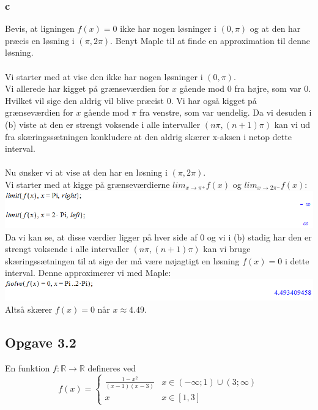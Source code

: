 \documentclass[12pt]{article}
\begin{document}
\subsubsection*{c}
Bevis, at ligningen $f(x)=0$ ikke har nogen løsninger i $(0,\pi)$ og at den har præcis en løsning i $(\pi,2\pi)$. Benyt Maple til at finde en approximation til denne løsning.\\
\\
Vi starter med at vise den ikke har nogen løsninger i $(0,\pi)$.\\
Vi allerede har kigget på grænseværdien for $x$ gående mod 0 fra højre, som var 0. Hvilket vil sige den aldrig vil blive præcist 0. Vi har også kigget på grænseværdien for $x$ gående mod $\pi$ fra venstre, som var uendelig. Da vi desuden i (b) viste at den er strengt voksende i alle intervaller $(n\pi,(n+1)\pi)$ kan vi ud fra skæringssætningen konkludere at den aldrig skærer x-aksen i netop dette interval.\\
\\
Nu ønsker vi at vise at den har en løsning i $(\pi,2\pi)$.\\
Vi starter med at kigge på grænseværdierne $lim_{x\rightarrow\pi^{+}}f(x)$ og $lim_{x\rightarrow2\pi^{-}}f(x)$:\\
\includegraphics[scale=0.6]{Pic2}\\
Da vi kan se, at disse værdier ligger på hver side af $0$ og vi i (b) stadig har den er strengt voksende i alle intervaller $(n\pi,(n+1)\pi)$ kan vi bruge skæringssætningen til at sige der må være nøjagtigt en løsning $f(x)=0$ i dette interval. Denne approximerer vi med Maple:\\
\includegraphics[scale=0.6]{Pic3}\\
Altså skærer $f(x)=0$ når $x\approx 4.49$.

\newpage

\subsection*{Opgave 3.2}
En funktion $f:\mathbb{R}\rightarrow\mathbb{R}$ defineres ved
$$f(x) = \left\{ \begin{array}{rl}
\frac{1-x^2}{(x-1)(x-3)} &\mbox{$x\in (-\infty;1)\cup(3;\infty)$} \\
x &\mbox{$x\in [1,3]$}
\end{array} \right.$$
\end{document}
